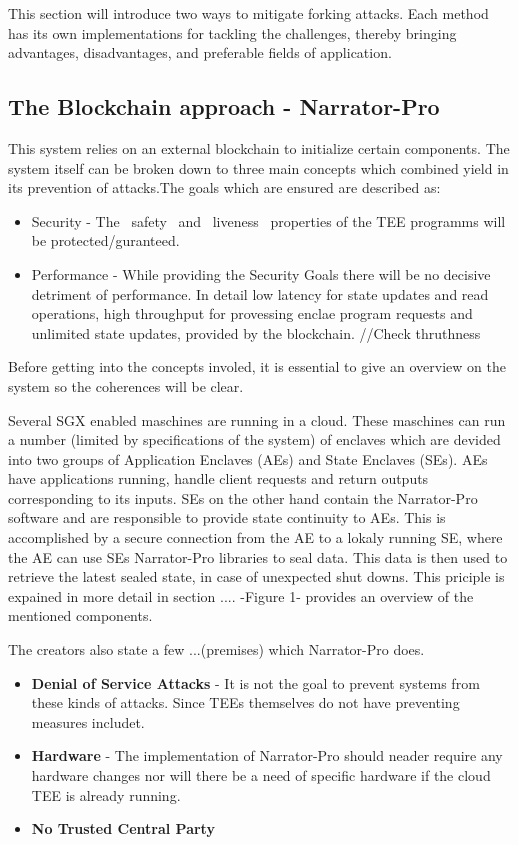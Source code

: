  
 This section will introduce two ways to mitigate forking attacks. Each method has its own implementations for tackling the challenges, thereby bringing advantages, disadvantages, and preferable fields of application.

\subsection{The Blockchain approach - Narrator-Pro}

This system relies on an external blockchain to initialize certain components. The system itself can be broken down to three main concepts which combined yield in its prevention of attacks.The goals which are ensured are described as:
\begin{itemize}
    \item Security - The ~safety~ and ~liveness~ properties of the TEE programms will be protected/guranteed.
    \item Performance -  While providing the Security Goals there will be no decisive detriment of performance. In detail low latency for state updates and read operations, high throughput for provessing enclae program requests and unlimited state updates, provided by the blockchain. //Check thruthness
\end{itemize} 
Before getting into the concepts involed, it is essential to give an overview on the system so the coherences will be clear.

Several SGX enabled maschines are running in a cloud. These maschines can run a number (limited by specifications of the system) of enclaves which are devided into two groups of Application Enclaves (AEs) and State Enclaves (SEs). AEs have applications running, handle client requests and return outputs corresponding to its inputs. SEs on the other hand contain the Narrator-Pro software and are responsible to provide state continuity to AEs. This is accomplished by a secure connection from the AE to a lokaly running SE, where the AE can use SEs Narrator-Pro libraries to seal data. This data is then used to retrieve the latest sealed state, in case of unexpected shut downs. This priciple is expained in more detail in section .... -Figure 1- provides an overview of the mentioned components.

The creators also state a few ...(premises) which Narrator-Pro does. 
\begin{itemize}
    \item \textbf{Denial of Service Attacks} - It is not the goal to prevent systems from these kinds of attacks. Since TEEs themselves do not have preventing measures includet. 
    \item \textbf{Hardware} - The implementation of Narrator-Pro should neader require any hardware changes nor will there be a need of specific hardware if the cloud TEE is already running. 
    \item \textbf{No Trusted Central Party}
\end{itemize} 

